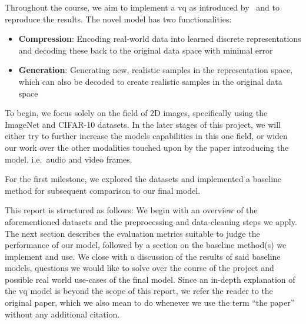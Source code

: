 Throughout the course, we aim to implement a \ac{vq} as introduced by~\cite{vqvae}
and to reproduce the results.
The novel model has two functionalities:
\begin{itemize}
    \item \textbf{Compression}: Encoding real-world data into learned discrete representations and decoding
    these back to the original data space with minimal error
    \item \textbf{Generation}: Generating new, realistic samples in the representation space, which can also be
    decoded to create realistic samples in the original data space
\end{itemize}
To begin, we focus solely on the field of 2D images, specifically using the ImageNet and CIFAR-10 datasets.
In the later stages of this project, we will either try to further increase the models capabilities in this one field,
or widen our work over the other modalities touched upon by the paper introducing the model, i.e.\ audio and video
frames.

For the first milestone, we explored the datasets and implemented a baseline method for subsequent comparison to our
final model.

This report is structured as follows: We begin with an overview of the aforementioned datasets and the preprocessing and
data-cleaning steps we apply.
The next section describes the evaluation metrics suitable to judge the performance of our model, followed by a
section on the baseline method(s) we implement and use.
We close with a discussion of the results of said baseline models, questions we would like to solve over the course of
the project and possible real world use-cases of the final model.
Since an in-depth explanation of the \ac{vq} model is beyond the scope of this report, we refer the reader to the
original paper,
which we also mean to do whenever we use the term ``the paper'' without any additional citation.
